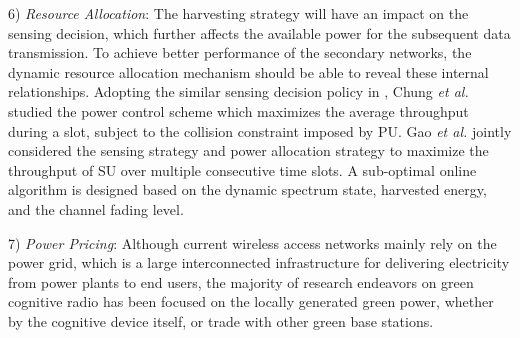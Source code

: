 \documentclass[journal,12pt,onecolumn]{IEEEtran}
\begin{document}
6) \emph{Resource Allocation}: The harvesting strategy will have an impact on the sensing decision, which further affects the available power for the subsequent data transmission. To achieve better performance of the secondary networks, the dynamic resource allocation mechanism should be able to reveal these internal relationships. Adopting the similar sensing decision policy in \cite{EHoverlayCR}, Chung \emph{et al.} \cite{6692333} studied the power control scheme which maximizes the average throughput during a slot, subject to the collision constraint imposed by PU. Gao \emph{et al.} \cite{PCandSD} jointly considered the sensing strategy and power allocation strategy to maximize the throughput of SU over multiple consecutive time slots. A sub-optimal online algorithm is designed based on the dynamic spectrum state, harvested energy, and the channel fading level.

7) \emph{Power Pricing}: Although current wireless access networks mainly rely on the power grid, which is a large interconnected infrastructure for delivering electricity from power plants to end users, the majority of research endeavors on green cognitive radio has been focused on the locally generated green power, whether by the cognitive device itself, or trade with other green base stations. 
\end{document}
